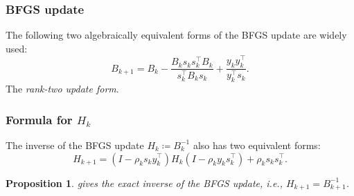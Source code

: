 \documentclass[a4paper, 10pt, dvipdfmx,draft]{article}
\newcommand{\defeq}{\coloneqq}
\newtheorem{proposition}{Proposition}
\begin{document}
\subsubsection{BFGS update}\label{sec:BFGS_update}

The following two algebraically equivalent forms of the BFGS update are widely used:
\begin{equation}\label{eq:Bk_rank}
    B_{k+1}   = B_k - \frac{B_k s_k s_k^\top B_k}{s_k^\top B_k s_k} + \frac{y_k y_k^\top}{y_k^\top s_k}.
\end{equation}
The \emph{rank-two update form}.

\subsubsection{Formula for \texorpdfstring{$H_k$}{Hk}}

The inverse of the BFGS update $H_k \defeq B_k^{-1}$ also has two equivalent forms:
\begin{equation}
    H_{k+1} = (I - \rho_k s_k y_k^\top) H_k (I - \rho_k y_k s_k^\top) + \rho_k s_k s_k^\top. \label{eq:Hk_compact}
\end{equation}

\begin{proposition}
     gives the exact inverse of the BFGS update, i.e., $H_{k+1} = B_{k+1}^{-1}$.
\end{proposition}
\end{document}
